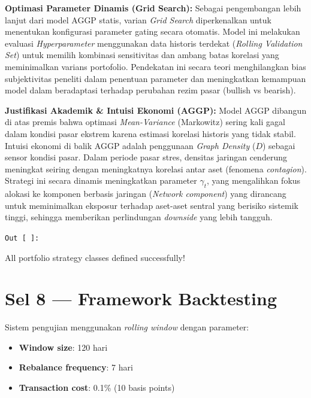 \documentclass[12pt,a4paper]{article}
\newcommand{\cellOut}{%
  \vspace{-4pt}%
  \begin{tcolorbox}[cellheader, colback=outputbg, colframe=outputframe, fontupper=\sffamily\small\bfseries\color{outputframe!80!black}]
    \texttt{Out [ ]:}
  \end{tcolorbox}\vspace{-6pt}%
}
\begin{document}
\textbf{Optimasi Parameter Dinamis (Grid Search):}
Sebagai pengembangan lebih lanjut dari model AGGP statis, varian \textit{Grid Search} diperkenalkan untuk menentukan konfigurasi parameter gating secara otomatis. Model ini melakukan evaluasi \textit{Hyperparameter} menggunakan data historis terdekat (\textit{Rolling Validation Set}) untuk memilih kombinasi sensitivitas dan ambang batas korelasi yang meminimalkan varians portofolio. Pendekatan ini secara teori menghilangkan bias subjektivitas peneliti dalam penentuan parameter dan meningkatkan kemampuan model dalam beradaptasi terhadap perubahan rezim pasar (bullish vs bearish).

\textbf{Justifikasi Akademik \& Intuisi Ekonomi (AGGP):}
Model AGGP dibangun di atas premis bahwa optimasi \textit{Mean-Variance} (Markowitz) sering kali gagal dalam kondisi pasar ekstrem karena estimasi korelasi historis yang tidak stabil. Intuisi ekonomi di balik AGGP adalah penggunaan \textit{Graph Density} ($D$) sebagai sensor kondisi pasar. Dalam periode pasar stres, densitas jaringan cenderung meningkat seiring dengan meningkatnya korelasi antar aset (fenomena \textit{contagion}). Strategi ini secara dinamis meningkatkan parameter $\gamma_t$, yang mengalihkan fokus alokasi ke komponen berbasis jaringan (\textit{Network component}) yang dirancang untuk meminimalkan eksposur terhadap aset-aset sentral yang berisiko sistemik tinggi, sehingga memberikan perlindungan \textit{downside} yang lebih tangguh.

\cellOut
\begin{tcolorbox}[outputbox]
All portfolio strategy classes defined successfully!
\end{tcolorbox}

\section{Sel 8 --- Framework Backtesting}

Sistem pengujian menggunakan \emph{rolling window} dengan parameter:

\begin{itemize}
  \item \textbf{Window size}: 120 hari
  \item \textbf{Rebalance frequency}: 7 hari
  \item \textbf{Transaction cost}: 0.1\% (10 basis points)
\end{itemize}
\end{document}
